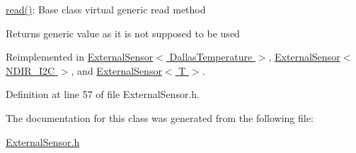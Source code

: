 \hyperlink{class_base_external_sensor_a7e0a98f350148d7645031315657aa5ec}{read()}\+: Base class virtual generic read method

\begin{DoxyReturn}{Returns}
generic value as it is not supposed to be used 
\end{DoxyReturn}


Reimplemented in \hyperlink{class_external_sensor_3_01_dallas_temperature_01_4_a127ead06440ec972c22db2abeb8e2b51}{External\+Sensor$<$ Dallas\+Temperature $>$}, \hyperlink{class_external_sensor_3_01_n_d_i_r___i2_c_01_4_add67f5ecaf47d2ee675e8299aee7322d}{External\+Sensor$<$ N\+D\+I\+R\+\_\+\+I2\+C $>$}, and \hyperlink{class_external_sensor_a6dbf2d6b1c183740ce0f153d6e43ccb2}{External\+Sensor$<$ T $>$}.



Definition at line 57 of file External\+Sensor.\+h.



The documentation for this class was generated from the following file\+:\begin{DoxyCompactItemize}
\item 
\hyperlink{_external_sensor_8h}{External\+Sensor.\+h}\end{DoxyCompactItemize}
